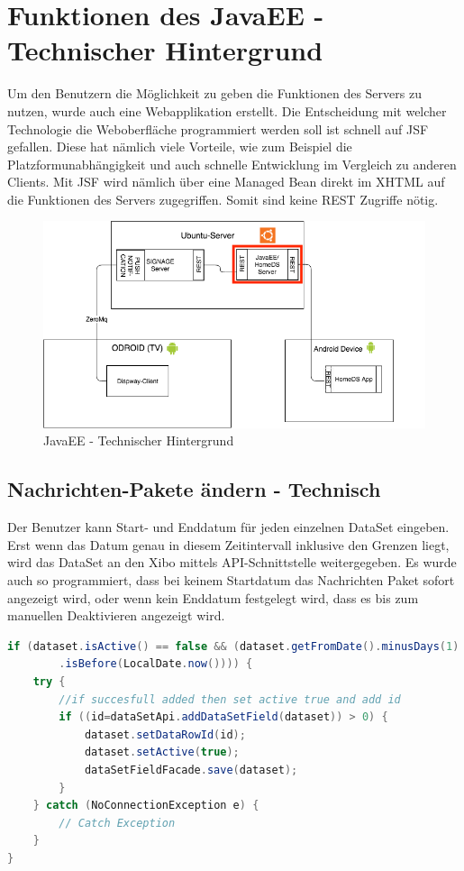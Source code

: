 \section{Funktionen des JavaEE - Technischer Hintergrund}
\label{sec:javaeetechnicalbackground}
Um den Benutzern die Möglichkeit zu geben die Funktionen des Servers zu nutzen, wurde auch eine Webapplikation erstellt. Die Entscheidung mit welcher Technologie die Weboberfläche programmiert werden soll ist schnell auf JSF gefallen. Diese hat nämlich viele Vorteile, wie zum Beispiel die Platzformunabhängigkeit und auch schnelle Entwicklung im Vergleich zu anderen Clients. Mit JSF wird nämlich über eine Managed Bean direkt im XHTML auf die Funktionen des Servers zugegriffen. Somit sind keine REST Zugriffe nötig.

\begin{figure}[H]
\centering
\includegraphics[width=1\textwidth]{images/08_HomeDsWeb/javaee.png}
\caption{JavaEE - Technischer Hintergrund}
\label{img:crawler}
\end{figure}

\subsection{Nachrichten-Pakete ändern - Technisch}\label{sec:datasetexpiredatetechnical}
Der Benutzer kann Start- und Enddatum für jeden einzelnen DataSet eingeben. Erst wenn das Datum genau in diesem Zeitintervall inklusive den Grenzen liegt, wird das DataSet an den Xibo mittels API-Schnittstelle weitergegeben. Es wurde auch so programmiert, dass bei keinem Startdatum das Nachrichten Paket sofort angezeigt wird, oder wenn kein Enddatum festgelegt wird, dass es bis zum manuellen Deaktivieren angezeigt wird.

\begin{lstlisting}[language=Java, caption={public void doCheckEvery24Hours()}]
if (dataset.isActive() == false && (dataset.getFromDate().minusDays(1)
        .isBefore(LocalDate.now()))) {
    try {
        //if succesfull added then set active true and add id
        if ((id=dataSetApi.addDataSetField(dataset)) > 0) {
            dataset.setDataRowId(id);
            dataset.setActive(true);
            dataSetFieldFacade.save(dataset);
        }
    } catch (NoConnectionException e) {
        // Catch Exception
    }
}
\end{lstlisting}

